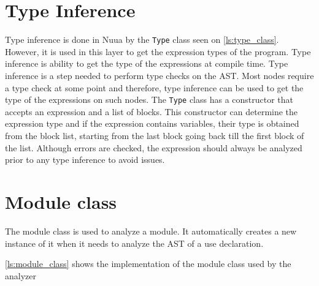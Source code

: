 \section{Type Inference}

Type inference is done in Nuua by the \texttt{Type} class seen on \autoref{ls:type_class}. However, it is used in this layer to get
the expression types of the program. Type inference is ability to get the type of the expressions at compile time. Type inference is
a step needed to perform type checks on the AST. Most nodes require a type check at some point and therefore, type inference can be used
to get the type of the expressions on such nodes. The \texttt{Type} class has a constructor that accepts an expression and a list of blocks.
This constructor can determine the expression type and if the expression contains variables, their type is obtained from the block list,
starting from the last block going back till the first block of the list. Although errors are checked, the expression should always be analyzed prior
to any type inference to avoid issues.

\section{Module class}

The module class is used to analyze a module. It automatically creates a new instance of it when it needs to analyze
the AST of a use declaration.

\autoref{ls:module_class} shows the implementation of the module class used by the analyzer\\

